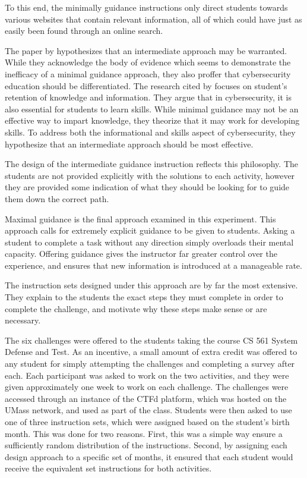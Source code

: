         To this end, the minimally guidance instructions only direct students towards various websites that contain relevant information, all of which could have just as easily been found through an online search. 

        The paper by \textcite{R-Weiss} hypothesizes that an intermediate approach may be warranted. %
While they acknowledge the body of evidence which seems to demonstrate the inefficacy of a minimal guidance approach, they also proffer that cybersecurity education should be differentiated. %
The research cited by \citeauthor{J-Sweller} focuses on student's retention of knowledge and information. %
They argue that in cybersecurity, it is also essential for students to learn skills. %
While minimal guidance may not be an effective way to impart knowledge, they theorize that it may work for developing skills. %
To address both the informational and skills aspect of cybersecurity, they hypothesize that an intermediate approach should be most effective. 

        The design of the intermediate guidance instruction reflects this philosophy. %
The students are not provided explicitly with the solutions to each activity, however they are provided some indication of what they should be looking for to guide them down the correct path.

        Maximal guidance is the final approach examined in this experiment. %
This approach calls for extremely explicit guidance to be given to students. %
Asking a student to complete a task without any direction simply overloads their mental capacity. %
Offering guidance gives the instructor far greater control over the experience, and ensures that new information is introduced at a manageable rate. 

        The instruction sets designed under this approach are by far the most extensive. %
They explain to the students the exact steps they must complete in order to complete the challenge, and motivate why these steps make sense or are necessary. 

    The six challenges were offered to the students taking the course CS 561 System Defense and Test. %
As an incentive, a small amount of extra credit was offered to any student for simply attempting the challenges and completing a survey after each. %
Each participant was asked to work on the two activities, and they were given approximately one week to work on each challenge. %
The challenges were accessed through an instance of the CTFd platform, which was hosted on the UMass network, and used as part of the class. %
Students were then asked to use one of three instruction sets, which were assigned based on the student's birth month. %
This was done for two reasons. %
First, this was a simple way ensure a sufficiently random distribution of the instructions. %
Second, by assigning each design approach to a specific set of months, it ensured that each student would receive the equivalent set instructions for both activities. 

